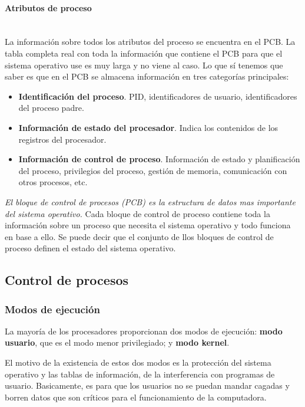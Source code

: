 \documentclass[12pt]{article}
\begin{document}
  \paragraph{Atributos de proceso}\mbox{}\\
  La información sobre todos los atributos del proceso se encuentra en el PCB. La tabla completa real con toda la información que contiene el PCB para que el sistema operativo use es muy larga y no viene al caso. Lo que sí tenemos que saber es que en el PCB se almacena información en tres categorías principales:
  \begin{itemize}
    \item \textbf{Identificación del proceso}. PID, identificadores de usuario, identificadores del proceso padre.

    \item \textbf{Información de estado del procesador}. Indica los contenidos de los registros del procesador. 

    \item \textbf{Información de control de proceso}. Información de estado y planificación del proceso, privilegios del proceso, gestión de memoria, comunicación con otros procesos, etc.
  \end{itemize}

  \textit{El bloque de control de procesos (PCB) es la estructura de datos mas importante del sistema operativo.} Cada bloque de control de proceso contiene toda la información sobre un proceso que necesita el sistema operativo y todo funciona en base a ello. Se puede decir que el conjunto de llos bloques de control de proceso definen el estado del sistema operativo.

  \subsection{Control de procesos}
  \subsubsection{Modos de ejecución}
  La mayoría de los procesadores proporcionan dos modos de ejecución: \textbf{modo usuario}, que es el modo menor privilegiado; y \textbf{modo kernel}.

  El motivo de la existencia de estos dos modos es la protección del sistema operativo y las tablas de información, de la interferencia con programas de usuario. Basicamente, es para que los usuarios no se puedan mandar cagadas y borren datos que son críticos para el funcionamiento de la computadora.
\end{document}
